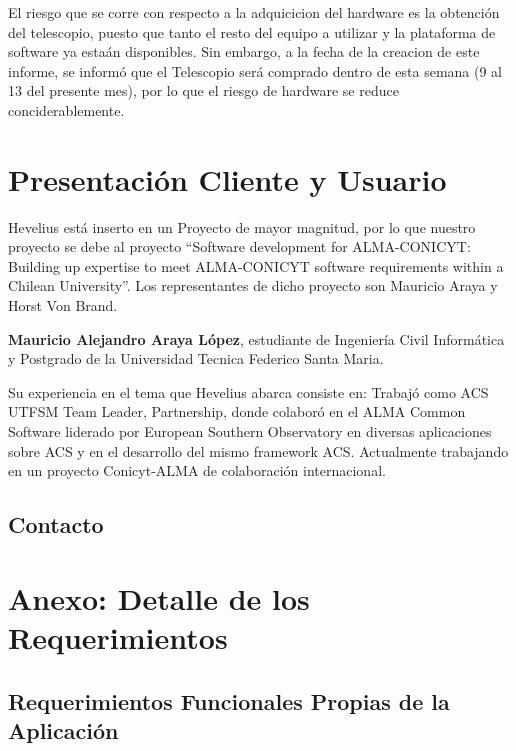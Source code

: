 \documentclass[letterpaper,spanish,10pt]{article}
\begin{document}
El riesgo que se corre con respecto a la adquicicion del hardware es la obtenci\'on del telescopio, puesto que tanto el resto del equipo a utilizar y la plataforma de software ya esta\'an disponibles.
Sin embargo, a la fecha de la creacion de este informe, se inform\'o que el Telescopio ser\'a comprado dentro de esta semana (9 al 13 del presente mes), por lo que el riesgo de hardware se reduce conciderablemente.

\newpage


\section{Presentaci\'on Cliente y Usuario}
Hevelius est\'a inserto en un Proyecto de mayor magnitud, por lo que nuestro proyecto se debe al proyecto ``Software development for ALMA-CONICYT: Building up expertise to meet ALMA-CONICYT software requirements within a Chilean University''. Los representantes de dicho proyecto son Mauricio Araya y Horst Von Brand.

{\bf Mauricio Alejandro Araya L\'opez}, estudiante de Ingenier\'ia Civil Inform\'atica y Postgrado de la Universidad Tecnica Federico Santa Maria. 

Su experiencia en el tema que Hevelius abarca consiste en:
Trabaj\'o como ACS UTFSM Team Leader, Partnership, donde colabor\'o en el ALMA Common Software
liderado por European Southern Observatory en diversas aplicaciones sobre ACS y en el desarrollo del mismo framework ACS. Actualmente trabajando en un proyecto Conicyt-ALMA de colaboraci\'on
internacional.





\subsection{Contacto}


\newpage


\section{Anexo: Detalle de los Requerimientos}

\subsection{Requerimientos Funcionales Propias de la Aplicaci\'on}
\end{document}
